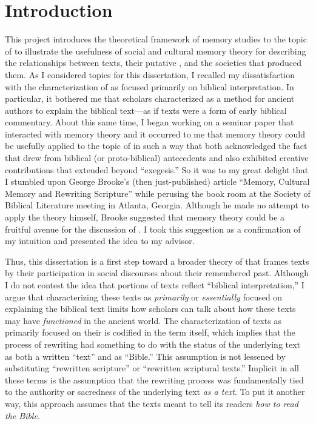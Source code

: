 
\chapter*{Introduction}


This project introduces the theoretical framework of memory studies to the topic of \rwb to illustrate the usefulness of social and cultural memory theory for describing the relationships between \rwb texts, their putative \vorlagen, and the societies that produced them. As I considered topics for this dissertation, I recalled my dissatisfaction with the characterization of \rwb as focused primarily on biblical interpretation. In particular, it bothered me that scholars characterized \rwb as a method for ancient authors to explain the biblical text---as if \rwb texts were a form of early biblical commentary. About this same time, I began working on a seminar paper that interacted with memory theory and it occurred to me that memory theory could be usefully applied to the topic of \rwb in such a way that both acknowledged the fact that \rwb drew from biblical (or proto-biblical) antecedents and also exhibited creative contributions that extended beyond ``exegesis.'' So it was to my great delight that I stumbled upon George Brooke's (then just-published) article ``Memory, Cultural Memory and Rewriting Scripture'' while perusing the book room at the Society of Biblical Literature meeting in Atlanta, Georgia.%
    \autocite{brooke_zsengeller2014}
Although he made no attempt to apply the theory himself, Brooke suggested that memory theory could be a fruitful avenue for the discussion of \rwb. I took this suggestion as a confirmation of my intuition and presented the idea to my advisor.

Thus, this dissertation is a first step toward a broader theory of \rwb that frames \rwb texts by their participation in social discourses about their remembered past. Although I do not contest the idea that portions of \rwb texts reflect ``biblical interpretation,'' I argue that characterizing these texts as \emph{primarily} or \emph{essentially} focused on explaining the biblical text limits how scholars can talk about how these texts may have \emph{functioned} in the ancient world. The characterization of \rwb texts as primarily focused on their \vorlagen is codified in the term \rwb itself, which implies that the process of rewriting had something to do with the status of the underlying text as both a written ``text'' and as ``Bible.'' This assumption is not lessened by substituting ``rewritten scripture'' or ``rewritten scriptural texts.'' Implicit in all these terms is the assumption that the rewriting process was fundamentally tied to the authority or sacredness of the underlying text \emph{as a text}. To put it another way, this approach assumes that the \rwb texts meant to tell its readers \emph{how to read the Bible}.

